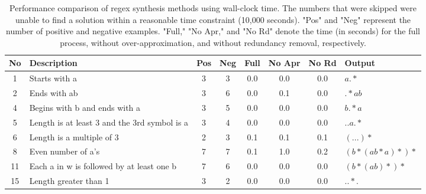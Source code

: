 \begin{table}[h!]
\centering
\label{tab:alpha_regex_performance_times}
\caption{Performance comparison of regex synthesis methods using wall-clock time. The numbers that were skipped were unable to find a solution within a reasonable time constraint (10,000 seconds). "Pos" and "Neg" represent the number of positive and negative examples. "Full," "No Apr," and "No Rd" denote the time (in seconds) for the full process, without over-approximation, and without redundancy removal, respectively.}
\begin{tabular}{|c|p{5cm}|c|c|c|c|c|l|}
\hline

\textbf{No} & \textbf{Description} & \textbf{Pos} & \textbf{Neg}  & \textbf{Full} & \textbf{No Apr} & \textbf{No Rd} & \textbf{Output} \\
\hline
1 & Starts with a & 3 & 3 & 0.0 & 0.0 & 0.0 & $a.*$ \\
2 & Ends with ab & 3 & 6 & 0.0 & 0.1 & 0.0 & $.*ab$ \\
4 & Begins with b and ends with a & 3 & 5 & 0.0 & 0.0 & 0.0 & $b.*a$ \\
5 & Length is at least 3 and the 3rd symbol is a & 3 & 4 & 0.0 & 0.0 & 0.0 & $..a.*$ \\
6 & Length is a multiple of 3 & 2 & 3 & 0.1 & 0.1 & 0.1 & $(...)*$ \\
8 & Even number of a's & 7 & 7 & 0.1 & 1.0 & 0.2 & $(b*(ab*a)*)*$ \\
11 & Each a in w is followed by at least one b & 7 & 6 & 0.0 & 0.0 & 0.0 & $(b*(ab)*)*$ \\
15 & Length greater than 1 & 3 & 2 & 0.0 & 0.0 & 0.0 & $..*.$ \\
\hline
\end{tabular}
\end{table}

